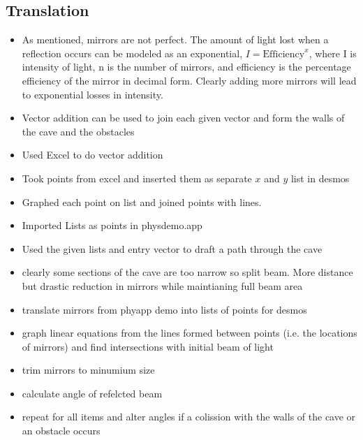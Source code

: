 \documentclass[11pt, letterpaper]{article}
\begin{document}
\subsection{Translation}
\par 

\begin{itemize}
	
\item	As mentioned, mirrors are not perfect. The amount of light lost when a reflection occurs can be modeled as an exponential, $I=\textrm{Efficiency}^x$, where I is intensity of light, n is the number of mirrors, and efficiency is the percentage efficiency of the mirror in decimal form. Clearly  adding more mirrors will lead to exponential losses in intensity.

\item Vector addition can be used to join each given vector and form the walls of the cave and the obstacles

\item Used Excel to do vector addition

\item Took points from excel and inserted them as separate $x$ and $y$ list in desmos

\item Graphed each point on list and joined points with lines.

\item Imported Lists as points in physdemo.app

\item Used the given lists and entry vector to draft a path through the cave

\item  clearly some sections of the cave are too narrow so split beam. More distance but drastic reduction in mirrors while maintianing full beam area

\item translate mirrors from phyapp demo into lists of points for desmos

\item graph linear equations from the lines formed between points (i.e. the locations of mirrors) and find intersections with initial beam of light

\item  trim mirrors to minumium size

\item calculate angle of refelcted beam 

\item repeat for all items and alter angles if a colission with the walls of the cave or an obstacle occurs
\end{itemize}
\end{document}
